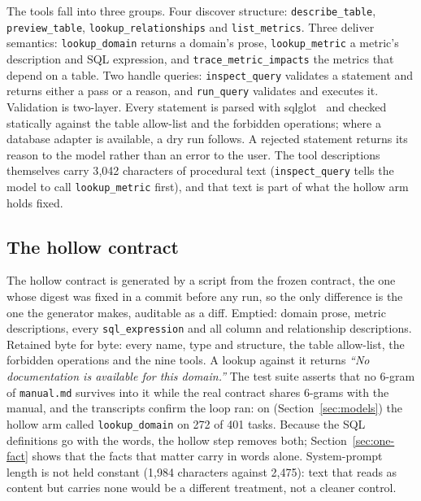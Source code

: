 {\sloppy The tools fall into three groups. Four discover structure:
\texttt{describe\_table}, \texttt{preview\_table},
\texttt{lookup\_relationships} and \texttt{list\_metrics}. Three deliver
semantics: \texttt{lookup\_domain} returns a domain's prose,
\texttt{lookup\_metric} a metric's description and SQL expression, and
\texttt{trace\_metric\_impacts} the metrics that depend on a table. Two
handle queries: \texttt{inspect\_query} validates a statement and returns
either a pass or a reason, and \texttt{run\_query} validates and executes
it. Validation is two-layer. Every statement is parsed with
sqlglot~\cite{sqlglot} and checked statically against the table allow-list
and the forbidden operations; where a database adapter is available, a dry
run follows. A rejected statement returns its reason to the model rather
than an error to the user. The tool descriptions themselves carry 3{,}042
characters of procedural text (\texttt{inspect\_query} tells the model to
call \texttt{lookup\_metric} first), and that text is part of what the
hollow arm holds fixed.\par}

\subsection{The hollow contract}
\label{sec:hollow}

The hollow contract is generated by a script from the frozen
contract, the one whose digest was fixed in a commit before any run, so the
only difference is the one the generator makes, auditable as a diff.
Emptied: domain prose, metric descriptions, every \texttt{sql\_expression}
and all column and relationship descriptions. Retained byte for byte:
every name, type and structure, the table allow-list, the forbidden
operations and the nine tools. A lookup against it returns \emph{``No
documentation is available for this domain.''} The test suite asserts that
no 6-gram of \texttt{manual.md} survives into it while the real contract
shares 6-grams with the manual, and the transcripts confirm the loop ran:
on \mGLM{} (Section~\ref{sec:models}) the hollow arm called
\texttt{lookup\_domain} on 272 of 401 tasks. Because the SQL definitions
go with the words, the hollow step removes both; Section~\ref{sec:one-fact}
shows that the facts that matter carry in words alone. System-prompt
length is not held constant (1{,}984 characters against
2{,}475): text that reads as content but carries none would be a different
treatment, not a cleaner control.

